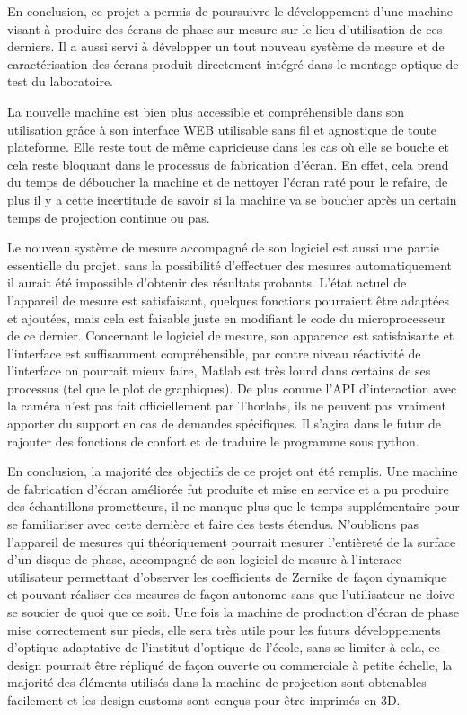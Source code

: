 En conclusion, ce projet a permis de poursuivre le développement d'une machine visant à produire des écrans
de phase sur-mesure sur le lieu d'utilisation de ces derniers. Il a aussi servi à développer un tout nouveau
système de mesure et de caractérisation des écrans produit directement intégré dans le montage optique de test du laboratoire.

La nouvelle machine est bien plus accessible et compréhensible dans son utilisation grâce à son interface WEB utilisable sans fil et
agnostique de toute plateforme. Elle reste tout de même capricieuse dans les cas où elle se bouche et cela reste bloquant dans le processus
de fabrication d'écran. En effet, cela prend du temps de déboucher la machine et de nettoyer l'écran raté pour le refaire, de plus il y a cette
incertitude de savoir si la machine va se boucher après un certain temps de projection continue ou pas.

Le nouveau système de mesure accompagné de son logiciel est aussi une partie essentielle du projet, sans la possibilité d'effectuer des mesures automatiquement
il aurait été impossible d'obtenir des résultats probants. L'état actuel de l'appareil de mesure est satisfaisant, quelques fonctions pourraient être
adaptées et ajoutées, mais cela est faisable juste en modifiant le code du microprocesseur de ce dernier.
Concernant le logiciel de mesure, son apparence est satisfaisante et l'interface est suffisamment compréhensible, par contre niveau réactivité de l'interface on pourrait mieux faire, Matlab est très lourd dans certains
de ses processus (tel que le plot de graphiques). De plus comme l'API d'interaction avec la caméra n'est pas fait officiellement par Thorlabs, ils ne peuvent pas vraiment apporter
du support en cas de demandes spécifiques. Il s'agira dans le futur de rajouter des fonctions de confort et de traduire le programme sous python.

En conclusion, la majorité des objectifs de ce projet ont été remplis. Une machine de fabrication d'écran améliorée fut produite et mise en service et a pu produire des échantillons prometteurs, il ne manque plus que
le temps supplémentaire pour se familiariser avec cette dernière et faire des tests étendus. N'oublions pas l'appareil de mesures qui théoriquement pourrait mesurer l'entièreté de la surface d'un disque de phase, accompagné de son
logiciel de mesure à l'interace utilisateur permettant d'observer les coefficients de Zernike de façon dynamique et pouvant réaliser des mesures de façon autonome sans que l'utilisateur ne doive se soucier de quoi que ce soit.
Une fois la machine de production d'écran de phase mise correctement sur pieds, elle sera très utile pour les futurs développements d'optique adaptative de l'institut d'optique de l'école, sans se limiter à cela, ce design pourrait être répliqué de façon ouverte
ou commerciale à petite échelle, la majorité des éléments utilisés dans la machine de projection sont obtenables facilement et les design customs sont conçus pour être imprimés en 3D.
\vfil
\hspace{8cm}\makeatletter\@author\makeatother\par

\hspace{8cm}\begin{minipage}{5cm}
    \printsignature
\end{minipage}